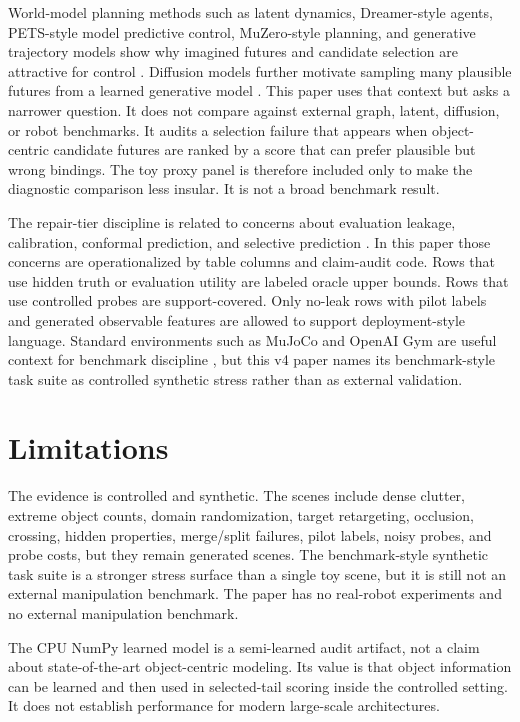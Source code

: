 \documentclass[10pt]{article}
\begin{document}
World-model planning methods such as latent dynamics, Dreamer-style agents, PETS-style model predictive control, MuZero-style planning, and generative trajectory models show why imagined futures and candidate selection are attractive for control \cite{hafner2019dream,hafner2020dreamer,chua2018deep,schrittwieser2020mastering,janner2022planning}. Diffusion models further motivate sampling many plausible futures from a learned generative model \cite{ho2020denoising}. This paper uses that context but asks a narrower question. It does not compare against external graph, latent, diffusion, or robot benchmarks. It audits a selection failure that appears when object-centric candidate futures are ranked by a score that can prefer plausible but wrong bindings. The toy proxy panel is therefore included only to make the diagnostic comparison less insular. It is not a broad benchmark result.

The repair-tier discipline is related to concerns about evaluation leakage, calibration, conformal prediction, and selective prediction \cite{guo2017calibration,vovk2005algorithmic,angelopoulos2021gentle}. In this paper those concerns are operationalized by table columns and claim-audit code. Rows that use hidden truth or evaluation utility are labeled oracle upper bounds. Rows that use controlled probes are support-covered. Only no-leak rows with pilot labels and generated observable features are allowed to support deployment-style language. Standard environments such as MuJoCo and OpenAI Gym are useful context for benchmark discipline \cite{todorov2012mujoco,brockman2016openai}, but this v4 paper names its benchmark-style task suite as controlled synthetic stress rather than as external validation.

\section{Limitations}

The evidence is controlled and synthetic. The scenes include dense clutter, extreme object counts, domain randomization, target retargeting, occlusion, crossing, hidden properties, merge/split failures, pilot labels, noisy probes, and probe costs, but they remain generated scenes. The benchmark-style synthetic task suite is a stronger stress surface than a single toy scene, but it is still not an external manipulation benchmark. The paper has no real-robot experiments and no external manipulation benchmark.

The CPU NumPy learned model is a semi-learned audit artifact, not a claim about state-of-the-art object-centric modeling. Its value is that object information can be learned and then used in selected-tail scoring inside the controlled setting. It does not establish performance for modern large-scale architectures.
\end{document}
